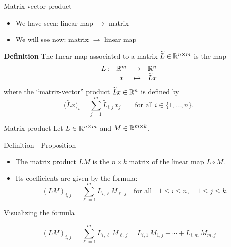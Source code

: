 \documentclass{beamer}
\begin{document}
\begin{frame}[t]{Matrix-vector product}
	\begin{itemize}
		\item We have seen: \quad linear map $\to$ matrix
		\item We will see now: \quad matrix $\to$ linear map
	\end{itemize}

	\vspace{0.1cm}
	\begin{block}{\bf Definition}
		The linear map associated to a matrix $\widetilde{L} \in \mathbb{R}^{n \times m}$ is the map
		$$
		\begin{array}{cccc}
			L:& \mathbb{R}^m & \to & \mathbb{R}^n \\
			  & x & \mapsto & \widetilde{L}x
		\end{array}
		$$
		where the ``matrix-vector'' product $\widetilde{L}x \in \mathbb{R}^n$ is defined by
		$$
		\big(\widetilde{L}x\big)_i = \sum_{j=1}^m \widetilde{L}_{i,j} \, x_j \qquad \text{for all} \ i \in \{1, \dots, n\}.
		$$
		\vspace{-0.5cm}
	\end{block}
\end{frame}

\begin{frame}[t]{Matrix product}
	Let $L \in \mathbb{R}^{n \times m}$ and $M \in \mathbb{R}^{m \times k}$. 
	\vspace{1.5cm}
	\begin{block}{Definition - Proposition}
		\begin{itemize}
			\item The matrix product $LM$ is the $n \times k$ matrix of the linear map $L \circ M$.
				\vspace{0.1cm}
			\item Its coefficients are given by the formula:
		\vspace{-0.2cm}
				$$
				(LM)_{i,j} = \sum_{\ell=1}^m L_{i,\ell} M_{\ell,j} \quad \text{for all} \quad 1 \leq i \leq n, \quad 1 \leq j \leq k.
				$$
		\end{itemize}
		\vspace{-0.4cm}
	\end{block}
\end{frame}
\begin{frame}[t]{Visualizing the formula}
	\vspace{-0.9cm}
	\begin{exampleblock}{}
		\vspace{-0.4cm}
		$$
		(LM)_{i,j} = \sum_{\ell=1}^m L_{i,\ell} \, M_{\ell,j} 
		= L_{i,1} \, M_{1,j} + \cdots + L_{i,m} \, M_{m,j} 
		$$
		\vspace{-0.3cm}
	\end{exampleblock}
\end{frame}
\end{document}
